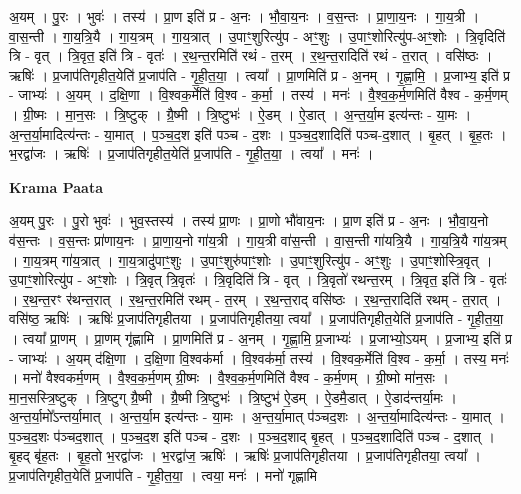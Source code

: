 \documentclass[17pt]{extarticle}
\begin{document}
अ॒यम् । पु॒रः । भुवः॑ । तस्य॑ । प्रा॒ण इति॑ प्र - अ॒नः । भौ॒वा॒य॒नः । व॒स॒न्तः । प्रा॒णा॒य॒नः । गा॒य॒त्री । वा॒स॒न्ती । गा॒य॒त्रि॒यै । गा॒य॒त्रम् । गा॒य॒त्रात् । उ॒पाꣳ॒॒शुरित्यु॑प - अꣳ॒॒शुः । उ॒पाꣳ॒॒शोरित्यु॑प-अꣳ॒॒शोः । त्रि॒वृदिति॑ त्रि - वृत् । त्रि॒वृत॒ इति॑ त्रि - वृतः॑ । र॒थ॒न्त॒रमिति॑ रथं - त॒रम् । र॒थ॒न्त॒रादिति॑ रथं - त॒रात् । वसि॑ष्ठः । ऋषिः॑ । प्र॒जाप॑तिगृहीत॒येति॑ प्र॒जाप॑ति - गृ॒ही॒त॒या॒ । त्वया᳚ । प्रा॒णमिति॑ प्र - अ॒नम् । गृ॒ह्णा॒मि॒ । प्र॒जाभ्य॒ इति॑ प्र - जाभ्यः॑ । अ॒यम् । द॒क्षि॒णा । वि॒श्वक॒र्मेति॑ वि॒श्व - क॒र्मा॒ । तस्य॑ । मनः॑ । वै॒श्व॒क॒र्म॒णमिति॑ वैश्व - क॒र्म॒णम् । ग्री॒ष्मः । मा॒न॒सः । त्रि॒ष्टुक् । ग्रै॒ष्मी । त्रि॒ष्टुभः॑ । ऐ॒डम् । ऐ॒डात् । अ॒न्त॒र्या॒म इत्य॑न्तः - या॒मः । अ॒न्त॒र्या॒मादित्य॑न्तः - या॒मात् । प॒ञ्च॒द॒श इति॑ पञ्च - द॒शः । प॒ञ्च॒द॒शादिति॑ पञ्च-द॒शात् । बृ॒हत् । बृ॒ह॒तः । भ॒रद्वा॑जः । ऋषिः॑ । प्र॒जाप॑तिगृहीत॒येति॑ प्र॒जाप॑ति - गृ॒ही॒त॒या॒ । त्वया᳚ । मनः॑ ।  \newline


\textbf{Krama Paata} \newline

अ॒यम् पु॒रः । पु॒रो भुवः॑ । भुव॒स्तस्य॑ । तस्य॑ प्रा॒णः । प्रा॒णो भौ॑वाय॒नः । प्रा॒ण इति॑ प्र - अ॒नः । भौ॒वा॒य॒नो व॑स॒न्तः । व॒स॒न्तः प्रा॑णाय॒नः । प्रा॒णा॒य॒नो गा॑य॒त्री । गा॒य॒त्री वा॑स॒न्ती । वा॒स॒न्ती गा॑यत्रि॒यै । गा॒य॒त्रि॒यै गा॑य॒त्रम् । गा॒य॒त्रम् गा॑य॒त्रात् । गा॒य॒त्रादु॑पाꣳ॒॒शुः । उ॒पाꣳ॒॒शुरु॑पाꣳ॒॒शोः । उ॒पाꣳ॒॒शुरित्यु॑प - अꣳ॒॒शुः । उ॒पाꣳ॒॒शोस्त्रि॒वृत् । उ॒पाꣳ॒॒शोरित्यु॑प - अꣳ॒॒शोः । त्रि॒वृत् त्रि॒वृतः॑ । त्रि॒वृदिति॑ त्रि - वृत् । त्रि॒वृतो॑ रथन्त॒रम् । त्रि॒वृत॒ इति॑ त्रि - वृतः॑ । र॒थ॒न्त॒रꣳ र॑थन्त॒रात् । र॒थ॒न्त॒रमिति॑ रथम् - त॒रम् । र॒थ॒न्त॒राद् वसि॑ष्ठः । र॒थ॒न्त॒रादिति॑ रथम् - त॒रात् । वसि॑ष्ठ॒ ऋषिः॑ । ऋषिः॑ प्र॒जाप॑तिगृहीतया । प्र॒जाप॑तिगृहीतया॒ त्वया᳚ । प्र॒जाप॑तिगृहीत॒येति॑ प्र॒जाप॑ति - गृ॒ही॒त॒या॒ । त्वया᳚ प्रा॒णम् । प्रा॒णम् गृ॑ह्णामि । प्रा॒णमिति॑ प्र - अ॒नम् । गृ॒ह्णा॒मि॒ प्र॒जाभ्यः॑ । प्र॒जाभ्यो॒ऽयम् । प्र॒जाभ्य॒ इति॑ प्र - जाभ्यः॑ । अ॒यम् द॑क्षि॒णा । द॒क्षि॒णा वि॒श्वक॑र्मा । वि॒श्वक॑र्मा॒ तस्य॑ । वि॒श्वक॒र्मेति॑ वि॒श्व - क॒र्मा॒ । तस्य॒ मनः॑ । मनो॑ वैश्वकर्म॒णम् । वै॒श्व॒क॒र्म॒णम् ग्री॒ष्मः । वै॒श्व॒क॒र्म॒णमिति॑ वैश्व - क॒र्म॒णम् । ग्री॒ष्मो मा॑न॒सः । मा॒न॒सस्त्रि॒ष्टुक् । त्रि॒ष्टुग् ग्रै॒ष्मी । ग्रै॒ष्मी त्रि॒ष्टुभः॑ । त्रि॒ष्टुभ॑ ऐ॒डम् । ऐ॒डमै॒डात् । ऐ॒डाद॑न्तर्या॒मः । अ॒न्त॒र्या॒मो᳚ऽन्तर्या॒मात् । अ॒न्त॒र्या॒म इत्य॑न्तः - या॒मः । अ॒न्त॒र्या॒मात् प॑ञ्चद॒शः । अ॒न्त॒र्या॒मादित्य॑न्तः - या॒मात् । प॒ञ्च॒द॒शः प॑ञ्चद॒शात् । प॒ञ्च॒द॒श इति॑ पञ्च - द॒शः । प॒ञ्च॒द॒शाद् बृ॒हत् । प॒ञ्च॒द॒शादिति॑ पञ्च - द॒शात् । बृ॒हद् बृ॑ह॒तः । बृ॒ह॒तो भ॒रद्वा॑जः । भ॒रद्वा॑ज॒ ऋषिः॑ । ऋषिः॑ प्र॒जाप॑तिगृहीतया । प्र॒जाप॑तिगृहीतया॒ त्वया᳚ । प्र॒जाप॑तिगृहीत॒येति॑ प्र॒जाप॑ति - गृ॒ही॒त॒या॒ । त्वया॒ मनः॑ । मनो॑ गृह्णामि \newline
\end{document}
